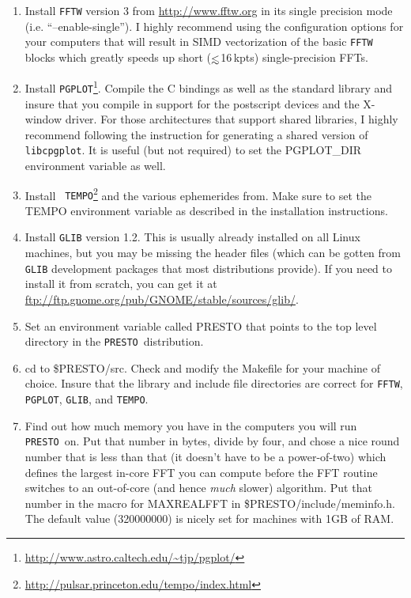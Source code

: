 \documentclass[11pt]{article}
\newcommand{\PRESTO}{{\tt PRESTO}}
\newcommand{\la}{\mathrel{\hbox{\rlap{\hbox{\lower4pt\hbox{$\sim$}}}\hbox{$<$}}}}
\begin{document}
\begin{enumerate}
  
\item Install {\tt FFTW} version 3 from \url{http://www.fftw.org} in
  its single precision mode (i.e. ``--enable-single'').  I highly
  recommend using the configuration options for your computers that
  will result in SIMD vectorization of the basic {\tt FFTW} blocks
  which greatly speeds up short ($\la$16\,kpts) single-precision FFTs.
  
\item Install {\tt PGPLOT}\footnote{
    \url{http://www.astro.caltech.edu/~tjp/pgplot/}}.  Compile the C
  bindings as well as the standard library and insure that you compile
  in support for the postscript devices and the X-window driver.  For
  those architectures that support shared libraries, I highly
  recommend following the instruction for generating a shared version
  of {\tt libcpgplot}.  It is useful (but not required) to set the
  PGPLOT\_DIR environment variable as well.
  
\item Install {\tt
    TEMPO}\footnote{\url{http://pulsar.princeton.edu/tempo/index.html}}
  and the various ephemerides from.  Make sure to set the TEMPO
  environment variable as described in the installation instructions.

\item Install {\tt GLIB} version 1.2.  This is usually already
  installed on all Linux machines, but you may be missing the header
  files (which can be gotten from {\tt GLIB} development packages that
  most distributions provide).  If you need to install it from
  scratch, you can get it at
  \url{ftp://ftp.gnome.org/pub/GNOME/stable/sources/glib/}.
  
\item Set an environment variable called PRESTO that points to the top
  level directory in the \PRESTO\ distribution.
  
\item cd to \$PRESTO/src.  Check and modify the Makefile for your
  machine of choice.  Insure that the library and include file
  directories are correct for {\tt FFTW}, {\tt PGPLOT}, {\tt GLIB},
  and {\tt TEMPO}.
  
\item Find out how much memory you have in the computers you will run
  \PRESTO\ on.  Put that number in bytes, divide by four, and chose a
  nice round number that is less than that (it doesn't have to be a
  power-of-two) which defines the largest in-core FFT you can compute
  before the FFT routine switches to an out-of-core (and hence
  \emph{much} slower) algorithm.  Put that number in the macro for
  MAXREALFFT in \$PRESTO/include/meminfo.h.  The default value
  (320000000) is nicely set for machines with 1GB of RAM.


\end{enumerate}
\end{document}
